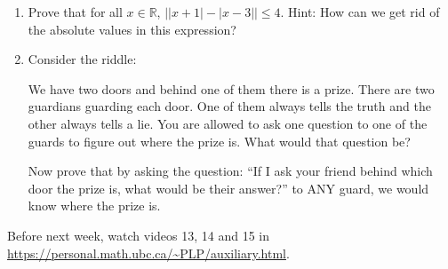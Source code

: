 \documentclass[12pt]{article}
\begin{document}
\begin{enumerate}
\item Prove that for all $x\in\mathbb R$, $\left| |x+1|-|x-3| \right|\leq 4$.
Hint: How can we get rid of the absolute values in this expression?

\item Consider the riddle:
\begin{center}
We have two doors and behind one of them there is a prize. There are two guardians guarding each door. One of them always tells the truth and the other always tells a lie. You are allowed to ask one question to one of the guards to figure out where the prize is. What would that question be?
\end{center}

Now prove that by asking the question: ``If I ask your friend behind which door the prize is, what would be their answer?'' to ANY guard, we would know where the prize is.

\end{enumerate}

Before next week, watch videos 13, 14 and 15 in \url{https://personal.math.ubc.ca/~PLP/auxiliary.html}.
\end{document}
